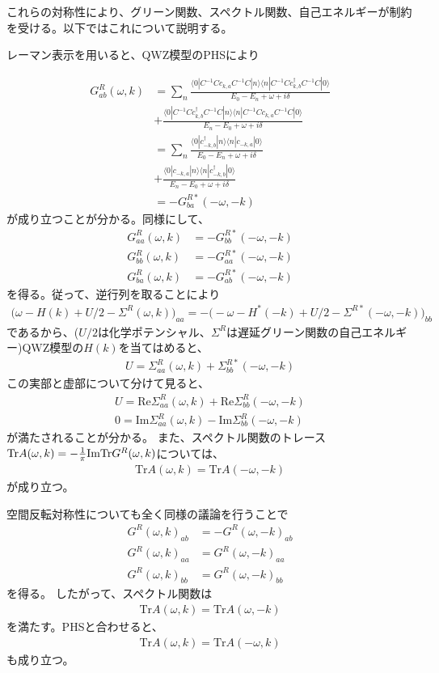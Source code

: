 \documentclass[12pt]{jsbook}
\newcommand{\la}{\langle}
\newcommand{\ra}{\rangle}
\newcommand{\ca}{c_{k,a}}
\newcommand{\cbd}{c_{k,b}^{\dagger}}
\newcommand{\cma}{c_{-k,a}}
\newcommand{\cbmd}{c_{-k,b}^{\dagger}}
\begin{document}
 これらの対称性により、グリーン関数、スペクトル関数、自己エネルギーが制約を受ける。以下ではこれについて説明する。

レーマン表示を用いると、QWZ模型のPHSにより 

\begin{align} 
G^R_{ab}(\omega,k) &= \displaystyle \sum_n \frac{\la 0|C^{-1}C\ca C^{-1}C |n\ra \la n|C^{-1}C \cbd C^{-1}C| 0\ra}{E_0-E_n + \omega + i\delta } \\
&+ \frac{\la 0|C^{-1}C\cbd C^{-1}C|n\ra \la n|C^{-1}C \ca C^{-1}C|0\ra}{E_n - E_0 + \omega + i\delta}\\ 
&=\displaystyle \sum_n \frac{\la 0|\cbmd |n\ra \la n| \cma | 0\ra}{E_0-E_n + \omega + i\delta } \\
&+ \frac{\la 0|\cma |n\ra \la n| \cbmd |0\ra}{E_n - E_0 + \omega + i\delta}\\
&=-G^{R*}_{ba}(-\omega,-k)
\end{align} 
が成り立つことが分かる。同様にして、
\begin{align} G^R_{aa}(\omega,k) &=-G^{R*}_{bb}(-\omega,-k)\\
G^R_{bb}(\omega,k) &=-G^{R*}_{aa}(-\omega,-k)\\
G^R_{ba}(\omega,k) &=-G^{R*}_{ab}(-\omega,-k)
\end{align} 
を得る。従って、逆行列を取ることにより
\begin{align}
\Big( \omega-H(k)+U/2-\Sigma^R(\omega,k)\Big)_{aa}=-\Big(-\omega-H^{*}(-k)+U/2-\Sigma^{R*}(-\omega,-k)\Big)_{bb} 
\end{align}  
であるから、($U/2$は化学ポテンシャル、$\Sigma^R$は遅延グリーン関数の自己エネルギー)QWZ模型の$H(k)$を当てはめると、
\begin{eqnarray}
U=\Sigma^{R}_{aa}(\omega,k)+\Sigma^{R*}_{bb}(-\omega,-k)
\end{eqnarray}
この実部と虚部について分けて見ると、
\begin{eqnarray}
    U=\mathrm{Re} \Sigma^{R}_{aa}(\omega,k)+\mathrm{Re} \Sigma^{R}_{bb}(-\omega,-k)\\
    0 = \mathrm{Im}\Sigma^{R}_{aa}(\omega,k)-\mathrm{Im}\Sigma^{R}_{bb}(-\omega,-k)
\end{eqnarray}
が満たされることが分かる。
また、スペクトル関数のトレース$\mathrm{Tr}A(\omega,k) =-{1\over\pi}\mathrm{ImTr}G^R(\omega,k)$については、 
\begin{eqnarray}
    \mathrm{Tr}A(\omega,k)=\mathrm{Tr}A(-\omega,-k)
\end{eqnarray}  
が成り立つ。

空間反転対称性についても全く同様の議論を行うことで
\begin{align}
G^R(\omega,k)_{ab}&=-G^R(\omega,-k)_{ab}\\
G^R(\omega,k)_{aa}&=G^R(\omega,-k)_{aa}\\
G^R(\omega,k)_{bb}&=G^R(\omega,-k)_{bb}
\end{align}  を得る。 したがって、スペクトル関数は 
\begin{eqnarray}
    \mathrm{Tr}A(\omega,k)=\mathrm{Tr}A(\omega,-k)
\end{eqnarray} 
を満たす。PHSと合わせると、 
\begin{eqnarray}
    \mathrm{Tr}A(\omega,k)=\mathrm{Tr}A(-\omega,k)
\end{eqnarray}
も成り立つ。
\end{document}
